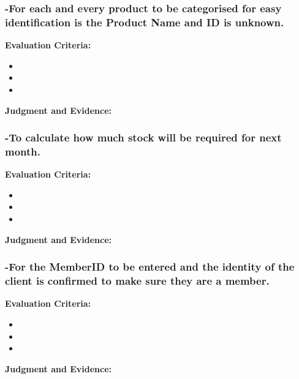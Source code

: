 \subsubsection{-For each and every product to be categorised for easy identification is the Product Name and ID is unknown.}
\textbf{Evaluation Criteria:} \newline
\begin{itemize}
\item{}
\item{}
\item{}
\end{itemize}

\textbf{Judgment and Evidence:} \newline









\subsubsection{-To calculate how much stock will be required for next month.}
\textbf{Evaluation Criteria:} \newline
\begin{itemize}
\item{}
\item{}
\item{}
\end{itemize}

\textbf{Judgment and Evidence:} \newline









\subsubsection{-For the MemberID to be entered and the identity of the client is confirmed to make sure they are a member.}
\textbf{Evaluation Criteria:} \newline
\begin{itemize}
\item{}
\item{}
\item{}
\end{itemize}

\textbf{Judgment and Evidence:} \newline









